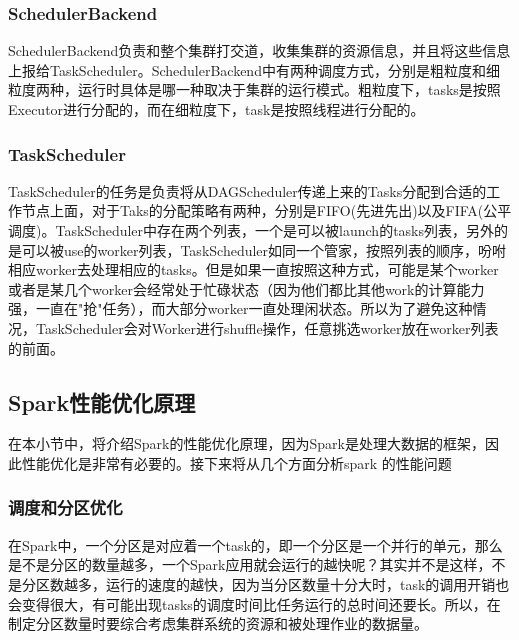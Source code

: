 \subsubsection{SchedulerBackend}
SchedulerBackend负责和整个集群打交道，收集集群的资源信息，并且将这些信息上报给TaskScheduler。SchedulerBackend中有两种调度方式，分别是粗粒度和细粒度两种，运行时具体是哪一种取决于集群的运行模式。粗粒度下，tasks是按照Executor进行分配的，而在细粒度下，task是按照线程进行分配的。
\subsubsection{TaskScheduler}
TaskScheduler的任务是负责将从DAGScheduler传递上来的Tasks分配到合适的工作节点上面，对于Taks的分配策略有两种，分别是FIFO(先进先出)以及FIFA(公平调度)。TaskScheduler中存在两个列表，一个是可以被launch的tasks列表，另外的是可以被use的worker列表，TaskScheduler如同一个管家，按照列表的顺序，吩咐相应worker去处理相应的tasks。但是如果一直按照这种方式，可能是某个worker或者是某几个worker会经常处于忙碌状态（因为他们都比其他work的计算能力强，一直在"抢"任务），而大部分worker一直处理闲状态。所以为了避免这种情况，TaskScheduler会对Worker进行shuffle操作，任意挑选worker放在worker列表的前面。

\subsection{Spark性能优化原理}
在本小节中，将介绍Spark的性能优化原理，因为Spark是处理大数据的框架，因此性能优化是非常有必要的。接下来将从几个方面分析spark 的性能问题
\subsubsection{调度和分区优化}
在Spark中，一个分区是对应着一个task的，即一个分区是一个并行的单元，那么是不是分区的数量越多，一个Spark应用就会运行的越快呢？其实并不是这样，不是分区数越多，运行的速度的越快，因为当分区数量十分大时，task的调用开销也会变得很大，有可能出现tasks的调度时间比任务运行的总时间还要长。所以，在制定分区数量时要综合考虑集群系统的资源和被处理作业的数据量。

